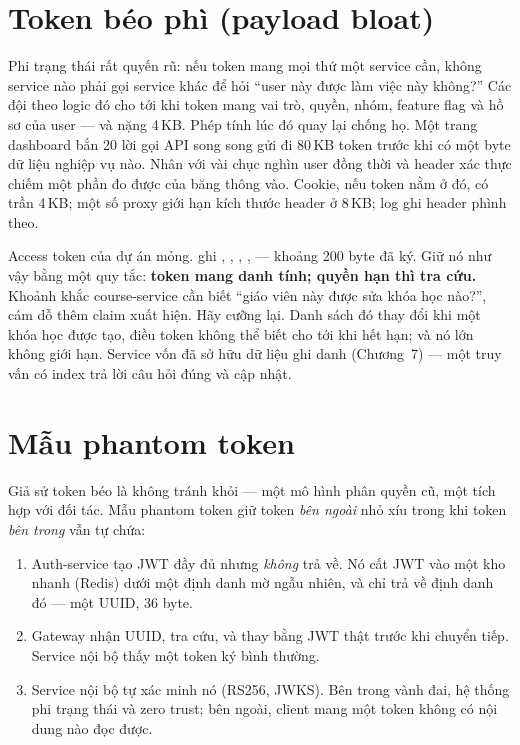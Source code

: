\section{Token béo phì (payload bloat)}
\label{sec:payload-bloat}

Phi trạng thái rất quyến rũ: nếu token mang mọi thứ một service cần,
không service nào phải gọi service khác để hỏi ``user này được làm việc
này không?'' Các đội theo logic đó cho tới khi token mang vai trò,
quyền, nhóm, feature flag và hồ sơ của user --- và nặng 4\,KB. Phép tính
lúc đó quay lại chống họ. Một trang dashboard bắn 20 lời gọi API song
song gửi đi 80\,KB token trước khi có một byte dữ liệu nghiệp vụ nào.
Nhân với vài chục nghìn user đồng thời và header xác thực chiếm một phần
đo được của băng thông vào. Cookie, nếu token nằm ở đó, có trần 4\,KB;
một số proxy giới hạn kích thước header ở 8\,KB; log ghi header phình
theo.

Access token của dự án mỏng.  ghi
, , , ,  --- khoảng
200 byte đã ký. Giữ nó như vậy bằng một quy tắc: \textbf{token mang danh
tính; quyền hạn thì tra cứu.} Khoảnh khắc course-service cần biết ``giáo
viên này được sửa khóa học nào?'', cám dỗ thêm claim 
xuất hiện. Hãy cưỡng lại. Danh sách đó thay đổi khi một khóa học được
tạo, điều token không thể biết cho tới khi hết hạn; và nó lớn không giới
hạn. Service vốn đã sở hữu dữ liệu ghi danh (Chương~7) --- một truy vấn
có index trả lời câu hỏi đúng và cập nhật.

\section{Mẫu phantom token}

Giả sử token béo là không tránh khỏi --- một mô hình phân quyền cũ, một
tích hợp với đối tác. Mẫu phantom token giữ token \emph{bên ngoài} nhỏ
xíu trong khi token \emph{bên trong} vẫn tự chứa:

\begin{enumerate}
  \item Auth-service tạo JWT đầy đủ nhưng \emph{không} trả về. Nó cất
  JWT vào một kho nhanh (Redis) dưới một định danh mờ ngẫu nhiên, và chỉ
  trả về định danh đó --- một UUID, 36 byte.
  \item Gateway nhận UUID, tra cứu, và thay bằng JWT thật trước khi
  chuyển tiếp. Service nội bộ thấy một token ký bình thường.
  \item Service nội bộ tự xác minh nó (RS256, JWKS). Bên trong vành đai,
  hệ thống phi trạng thái và zero trust; bên ngoài, client mang một token
  không có nội dung nào đọc được.
\end{enumerate}

